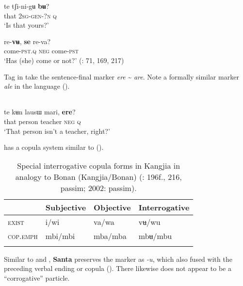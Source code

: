     \ex
    \gll te  tʃi-ni-gʉ \textbf{{bʉ}}?\\
    that  2\textsc{sg}-\textsc{gen}-?\textsc{n}  \textsc{q}\\
    \glt ‘Is that yours?’
    
    \ex
    \gll re-\textbf{{vʉ}}, \textbf{{se}} {re-va?}\\
    come-\textsc{pst}.\textsc{q}  \textsc{neg}  come-\textsc{pst}\\
    \glt ‘Has (she) come or not?’ (\citealt{Siqinchaoketu2002}: 71, 169, 217)
    \z
    \z 

Tag  in  take the sentence-final marker \textit{ere} {\textasciitilde} \textit{are}. Note a formally similar  marker \textit{ale} in the  language  ().

\ea%
    \label{ex:mong:46}
    \\
    \gll te  kʉn  lausɯ    mari, \textbf{{ere}}?\\
    that  person  teacher    \textsc{neg}  \textsc{q}\\
    \glt ‘That person isn’t a teacher, right?’ \citep[197]{Siqinchaoketu1999}
    \z

 has a copula system similar to  ().

\begin{table}
\caption{Special interrogative copula forms in Kangjia in analogy to Bonan (Kangjia/Bonan) (\citealt{Siqinchaoketu1999}: 196f., 216, passim; 2002: passim).}
\label{tab:mong:6}

\begin{tabularx}{\textwidth}{XXXl}
\lsptoprule
& \textbf{Subjective} & \textbf{Objective} & \textbf{Interrogative}\\
\midrule
\textsc{exist} & i/wi & va/wa & vʉ/wu\\
\textsc{cop}.\textsc{emph} & mbi/mbi & mba/mba & mbʉ/mbu\\
\lspbottomrule
\end{tabularx}
\end{table}

Similar to  and , \textbf{Santa} preserves the   marker as \textit{-}\textit{u}, which also fused with the preceding verbal ending or copula (). There likewise does not appear to be a “corrogative” particle.

